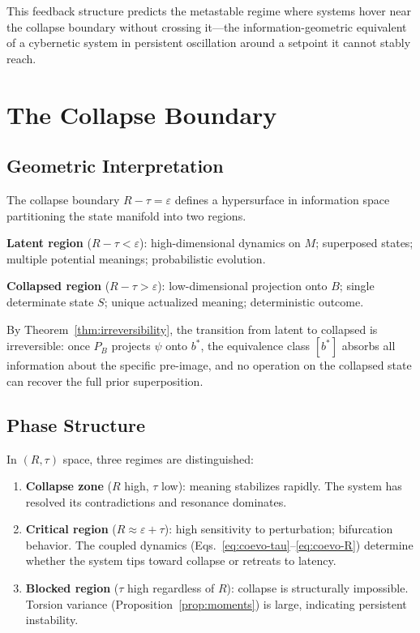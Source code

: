 \documentclass[11pt]{article}
\theoremstyle{plain}
\begin{document}
This feedback structure predicts the metastable regime where systems hover near the collapse
boundary without crossing it---the information-geometric equivalent of a cybernetic system in
persistent oscillation around a setpoint it cannot stably reach.

\section{The Collapse Boundary}

\subsection{Geometric Interpretation}

The collapse boundary $R - \tau = \varepsilon$ defines a hypersurface in information space
partitioning the state manifold into two regions.

\textbf{Latent region} ($R - \tau < \varepsilon$): high-dimensional dynamics on $M$; superposed
states; multiple potential meanings; probabilistic evolution.

\textbf{Collapsed region} ($R - \tau > \varepsilon$): low-dimensional projection onto $B$; single
determinate state $S$; unique actualized meaning; deterministic outcome.

By Theorem~\ref{thm:irreversibility}, the transition from latent to collapsed is irreversible:
once $P_B$ projects $\psi$ onto $b^*$, the equivalence class $[b^*]$ absorbs all information about
the specific pre-image, and no operation on the collapsed state can recover the full prior
superposition.

\subsection{Phase Structure}

In $(R, \tau)$ space, three regimes are distinguished:
\begin{enumerate}
  \item \textbf{Collapse zone} ($R$ high, $\tau$ low): meaning stabilizes rapidly. The system has
    resolved its contradictions and resonance dominates.
  \item \textbf{Critical region} ($R \approx \varepsilon + \tau$): high sensitivity to
    perturbation; bifurcation behavior. The coupled dynamics
    (Eqs.~\eqref{eq:coevo-tau}--\eqref{eq:coevo-R}) determine whether the system tips toward
    collapse or retreats to latency.
  \item \textbf{Blocked region} ($\tau$ high regardless of $R$): collapse is structurally
    impossible. Torsion variance (Proposition~\ref{prop:moments}) is large, indicating persistent
    instability.
\end{enumerate}
\end{document}
